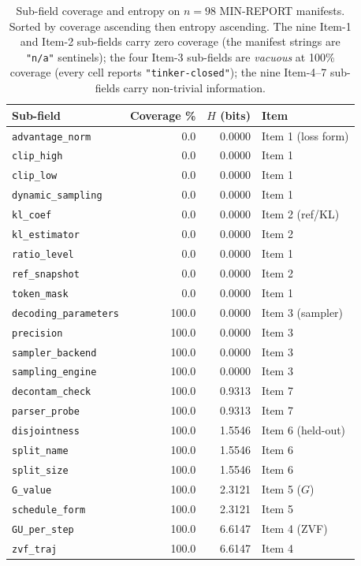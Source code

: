\documentclass{article}  \usepackage[preprint,nonatbib]{neurips_2026} \usepackage[numbers]{natbib}
\begin{document}
\begin{table}[t]
\centering\small
\caption{Sub-field coverage and entropy on $n{=}98$ MIN-REPORT
manifests. Sorted by coverage ascending then entropy ascending. The
nine Item-1 and Item-2 sub-fields carry zero coverage (the manifest
strings are \texttt{"n/a"} sentinels); the four Item-3 sub-fields are
\emph{vacuous} at 100\% coverage (every cell reports \texttt{"tinker-closed"});
the nine Item-4--7 sub-fields carry non-trivial information.}
\label{tab:p5-subfield-coverage}
\begin{tabular}{@{}lrrl@{}}
\toprule
Sub-field & Coverage \% & $H$ (bits) & Item \\
\midrule
\texttt{advantage\_norm}        &    0.0 & 0.0000 & Item 1 (loss form) \\
\texttt{clip\_high}             &    0.0 & 0.0000 & Item 1 \\
\texttt{clip\_low}              &    0.0 & 0.0000 & Item 1 \\
\texttt{dynamic\_sampling}      &    0.0 & 0.0000 & Item 1 \\
\texttt{kl\_coef}               &    0.0 & 0.0000 & Item 2 (ref/KL) \\
\texttt{kl\_estimator}          &    0.0 & 0.0000 & Item 2 \\
\texttt{ratio\_level}           &    0.0 & 0.0000 & Item 1 \\
\texttt{ref\_snapshot}          &    0.0 & 0.0000 & Item 2 \\
\texttt{token\_mask}            &    0.0 & 0.0000 & Item 1 \\
\midrule
\texttt{decoding\_parameters}   &  100.0 & 0.0000 & Item 3 (sampler) \\
\texttt{precision}              &  100.0 & 0.0000 & Item 3 \\
\texttt{sampler\_backend}       &  100.0 & 0.0000 & Item 3 \\
\texttt{sampling\_engine}       &  100.0 & 0.0000 & Item 3 \\
\midrule
\texttt{decontam\_check}        &  100.0 & 0.9313 & Item 7 \\
\texttt{parser\_probe}          &  100.0 & 0.9313 & Item 7 \\
\texttt{disjointness}           &  100.0 & 1.5546 & Item 6 (held-out) \\
\texttt{split\_name}            &  100.0 & 1.5546 & Item 6 \\
\texttt{split\_size}            &  100.0 & 1.5546 & Item 6 \\
\texttt{G\_value}               &  100.0 & 2.3121 & Item 5 ($G$) \\
\texttt{schedule\_form}         &  100.0 & 2.3121 & Item 5 \\
\texttt{GU\_per\_step}           &  100.0 & 6.6147 & Item 4 (ZVF) \\
\texttt{zvf\_traj}              &  100.0 & 6.6147 & Item 4 \\
\bottomrule
\end{tabular}
\end{table}
\end{document}
